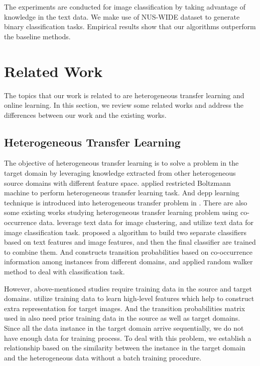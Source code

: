 \documentclass[letterpaper]{article}
\theoremstyle{remark}
\theoremstyle{definition}
\begin{document}
The experiments are conducted for image classification by taking advantage of knowledge in the text data.
We make use of NUS-WIDE dataset to generate binary classification tasks.
Empirical results show that our algorithms outperform the baseline methods.

\section{Related Work}

The topics that our work is related to are heterogeneous transfer learning and online learning.
In this section, we review some related works and address the differences between our work and the existing works.

\subsection{Heterogeneous Transfer Learning}
The objective of heterogeneous transfer learning is to solve a problem in the target domain by leveraging knowledge extracted from other heterogeneous source domains with different feature space.
\cite{wei2011heterogeneous} applied restricted Boltzmann machine to perform heterogeneous transfer learning task.
And depp learning technique is introduced into heterogeneous transfer problem in \cite{zhou2014hybrid}.
There are also some existing works studying heterogeneous transfer learning problem using co-occurrence data.
\cite{yang2009heterogeneous} leverage text data for image clustering, and \cite{zhu2011heterogeneous} utilize text data for image classification task.
\cite{wang2009building} proposed a algorithm to build two separate classifiers based on text features and image features, and then the final classifier are trained to combine them.
And \cite{ng2012co,wu2014co,tan2014mixed} constructs transition probabilities based on co-occurrence information among instances from different domains, and applied random walker method to deal with classification task.

However, above-mentioned studies require training data in the source and target domains.
\cite{zhu2011heterogeneous} utilize training data to learn high-level features which help to construct extra representation for target images.
And the transition probabilities matrix used in \cite{ng2012co,wu2014co} also need prior training data in the source as well as target domains.
Since all the data instance in the target domain arrive sequentially, we do not have enough data for training process.
To deal with this problem, we establish a relationship based on the similarity between the instance in the target domain and the heterogeneous data without a batch training procedure.
\end{document}

